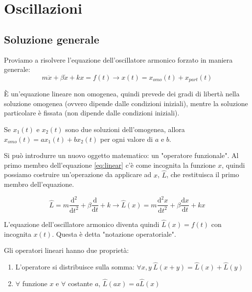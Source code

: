 \chapter{Oscillazioni}

\section{Soluzione generale}

Proviamo a risolvere l'equazione dell'oscillatore armonico forzato in maniera generale:
\begin{equation}
	\label{eq:linear}
	m \ddot{x} + \beta \dot{x} + kx = f(t) \to x(t) = x_{omo}(t) + x_{part}(t) 
\end{equation}

È un'equazione lineare non omogenea, quindi prevede dei gradi di libertà nella soluzione omogenea (ovvero dipende dalle condizioni iniziali), mentre la soluzione particolare è fissata (non dipende dalle condizioni iniziali).

\begin{lemma}
	Se \(x_{1}(t)\) e \(x_{2}(t)\) sono due soluzioni dell'omogenea, allora \(x_{omo}(t) = a x_{1}(t) + b x_{2}(t)\) per ogni valore di \(a\) e \(b\).   
\end{lemma}

Si può introdurre un nuovo oggetto matematico: un "operatore funzionale". Al primo membro dell'equazione \eqref{eq:linear} c'è come incognita la funzione \(x\), quindi possiamo costruire un'operazione da applicare ad \(x\), \(\hat{L} \), che restituisca il primo membro dell'equazione.

\[
	\hat{L} = m \frac{\mathrm{d}^2}{\mathrm{d}t^2} + \beta \frac{\mathrm{d}}{\mathrm{d}t} + k \to \hat{L} (x) = m \frac{\mathrm{d}^2 x}{\mathrm{d}t^2} + \beta \frac{\mathrm{d}x}{\mathrm{d}t} + kx
\]

L'equazione dell'oscillatore armonico diventa quindi \(\hat{L} (x) = f(t)\) con incognita \(x(t)\). Questa è detta "notazione operatoriale".

\begin{definition}
	Gli operatori lineari hanno due proprietà:
	\begin{enumerate}
		
		\item L'operatore si distribuisce sulla somma: \(\forall x,y\ \hat{L} (x+y) = \hat{L} (x) + \hat{L} (y)\)
		\item \(\forall \) funzione \(x\) e \(\forall \) costante \(a\), \(\hat{L} (ax) = a \hat{L} (x)\)    
	\end{enumerate}
\end{definition}

